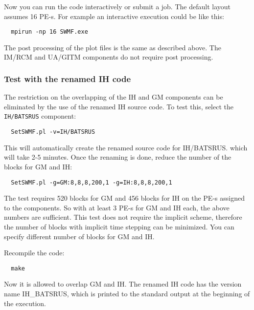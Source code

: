 \documentclass[twoside,10pt]{article}
\begin{document}
Now you can run the code interactively or submit a job.  The default
layout assumes 16 PE-s. For example an interactive execution could be
like this:
\begin{verbatim}
  mpirun -np 16 SWMF.exe
\end{verbatim}
The post processing of the plot files is the same as described above. 
The IM/RCM and UA/GITM components do not require post processing.

\subsubsection{Test with the renamed IH code}

The restriction on the overlapping of the IH and GM components
can be eliminated by the use of the renamed IH source code. 
To test this, select the {\tt IH/BATSRUS} component:
\begin{verbatim}
  SetSWMF.pl -v=IH/BATSRUS
\end{verbatim}
This will automatically create the renamed source code for IH/BATSRUS.
which will take 2-5 minutes. Once the renaming
is done, reduce the number of the blocks for GM and IH:
\begin{verbatim}
  SetSWMF.pl -g=GM:8,8,8,200,1 -g=IH:8,8,8,200,1
\end{verbatim}
The test requires 520 blocks for GM and 456 blocks for IH on the PE-s
assigned to the components. So with at least 3 PE-s for GM and IH each,
the above numbers are sufficient. This test does not require the implicit
scheme, therefore the number of blocks with implicit time stepping can
be minimized. You can specify different number of blocks for GM and IH. 

Recompile the code:
\begin{verbatim}
  make
\end{verbatim}
Now it is allowed to overlap GM and IH. The renamed IH code has the 
version name IH\_BATSRUS, which is printed to the standard output at the
beginning of the execution.
\end{document}

